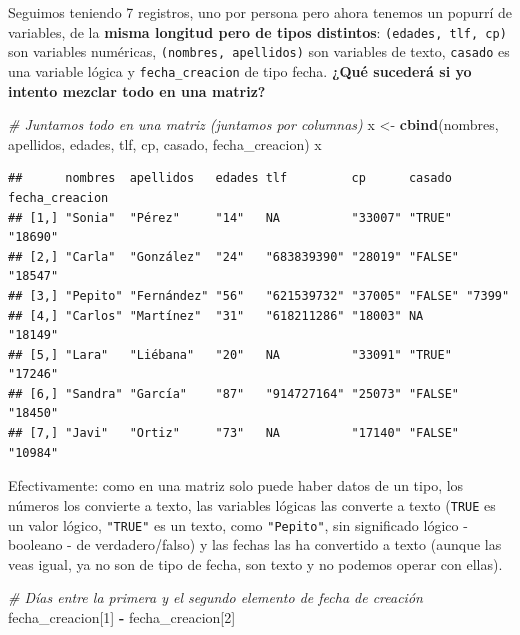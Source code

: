 \documentclass[11pt,]{book}
\newenvironment{Shaded}{\begin{snugshade}}{\end{snugshade}}
\newcommand{\CommentTok}[1]{\textcolor[rgb]{0.37,0.37,0.37}{\textit{#1}}}
\newcommand{\DecValTok}[1]{\textcolor[rgb]{0.06,0.06,0.06}{#1}}
\newcommand{\KeywordTok}[1]{\textcolor[rgb]{0.27,0.27,0.27}{\textbf{#1}}}
\newcommand{\NormalTok}[1]{#1}
\newcommand{\OperatorTok}[1]{\textcolor[rgb]{0.43,0.43,0.43}{\textbf{#1}}}
\newcommand{\StringTok}[1]{\textcolor[rgb]{0.5,0.5,0.5}{#1}}
\begin{document}
Seguimos teniendo 7 registros, uno por persona pero ahora tenemos un popurrí de variables, de la \textbf{misma longitud pero de tipos distintos}: \texttt{(edades,\ tlf,\ cp)} son variables numéricas, \texttt{(nombres,\ apellidos)} son variables de texto, \texttt{casado} es una variable lógica y \texttt{fecha\_creacion} de tipo fecha. \textbf{¿Qué sucederá si yo intento mezclar todo en una matriz?}

\begin{Shaded}
\begin{Highlighting}[]
\CommentTok{# Juntamos todo en una matriz (juntamos por columnas)}
\NormalTok{x <-}\StringTok{ }\KeywordTok{cbind}\NormalTok{(nombres, apellidos, edades, tlf, cp, casado, fecha_creacion)}
\NormalTok{x}
\end{Highlighting}
\end{Shaded}

\begin{verbatim}
##      nombres  apellidos   edades tlf         cp      casado  fecha_creacion
## [1,] "Sonia"  "Pérez"     "14"   NA          "33007" "TRUE"  "18690"       
## [2,] "Carla"  "González"  "24"   "683839390" "28019" "FALSE" "18547"       
## [3,] "Pepito" "Fernández" "56"   "621539732" "37005" "FALSE" "7399"        
## [4,] "Carlos" "Martínez"  "31"   "618211286" "18003" NA      "18149"       
## [5,] "Lara"   "Liébana"   "20"   NA          "33091" "TRUE"  "17246"       
## [6,] "Sandra" "García"    "87"   "914727164" "25073" "FALSE" "18450"       
## [7,] "Javi"   "Ortiz"     "73"   NA          "17140" "FALSE" "10984"
\end{verbatim}

Efectivamente: como en una matriz solo puede haber datos de un tipo, los números los convierte a texto, las variables lógicas las converte a texto (\texttt{TRUE} es un valor lógico, \texttt{"TRUE"} es un texto, como \texttt{"Pepito"}, sin significado lógico - booleano - de verdadero/falso) y las fechas las ha convertido a texto (aunque las veas igual, ya no son de tipo de fecha, son texto y no podemos operar con ellas).

\begin{Shaded}
\begin{Highlighting}[]
\CommentTok{# Días entre la primera y el segundo elemento de fecha de creación}
\NormalTok{fecha_creacion[}\DecValTok{1}\NormalTok{] }\OperatorTok{-}\StringTok{ }\NormalTok{fecha_creacion[}\DecValTok{2}\NormalTok{]}
\end{Highlighting}
\end{Shaded}
\end{document}
